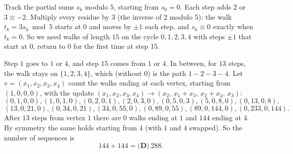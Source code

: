 Track the partial sums $s_k$ modulo $5$, starting from $s_0=0$. Each step adds $2$ or $3\equiv-2$. Multiply every residue by $3$ (the inverse of $2$ modulo $5$): the walk $t_k=3s_k \bmod 5$ starts at $0$ and moves by $\pm1$ each step, and $s_k\equiv0$ exactly when $t_k=0$. So we need walks of length $15$ on the cycle $0,1,2,3,4$ with steps $\pm1$ that start at $0$, return to $0$ for the first time at step $15$.

Step $1$ goes to $1$ or $4$, and step $15$ comes from $1$ or $4$. In between, for $13$ steps, the walk stays on $\{1,2,3,4\}$, which (without $0$) is the path $1-2-3-4$. Let $v=(x_1,x_2,x_3,x_4)$ count the walks ending at each vertex, starting from $(1,0,0,0)$, with the update $(x_1,x_2,x_3,x_4)\to(x_2,\,x_1+x_3,\,x_2+x_4,\,x_3)$:
\[(0,1,0,0),(1,0,1,0),(0,2,0,1),(2,0,3,0),(0,5,0,3),(5,0,8,0),(0,13,0,8),\]
\[(13,0,21,0),(0,34,0,21),(34,0,55,0),(0,89,0,55),(89,0,144,0),(0,233,0,144).\]
After $13$ steps from vertex $1$ there are $0$ walks ending at $1$ and $144$ ending at $4$. By symmetry the same holds starting from $4$ (with $1$ and $4$ swapped). So the number of sequences is
\[144+144=\boxed{\textbf{(D)}\ 288}.\]
